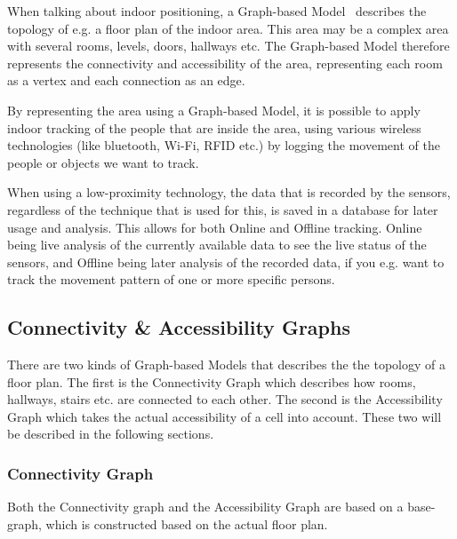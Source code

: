 When talking about indoor positioning, a Graph-based Model~\cite{Jensen:2009:GMB:1590953.1591000} describes the topology of e.g. a floor plan of the indoor area. 
This area may be a complex area with several rooms, levels, doors, hallways etc. 
The Graph-based Model therefore represents the connectivity and accessibility of the area, representing each room as a vertex and each connection as an edge. 

By representing the area using a Graph-based Model, it is possible to apply indoor tracking of the people that are inside the area, using various wireless technologies (like bluetooth, Wi-Fi, RFID etc.) by logging the movement of the people or objects we want to track.

When using a low-proximity technology, the data that is recorded by the sensors, regardless of the technique that is used for this, is saved in a database for later usage and analysis. 
This allows for both Online and Offline tracking.
Online being live analysis of the currently available data to see the live status of the sensors, and Offline being later analysis of the recorded data, if you e.g. want to track the movement pattern of one or more specific persons. 


\subsection{Connectivity \& Accessibility Graphs}
There are two kinds of Graph-based Models that describes the the topology of a floor plan. 
The first is the Connectivity Graph which describes how rooms, hallways, stairs etc. are connected to each other. 
The second is the Accessibility Graph which takes the actual accessibility of a cell into account. 
These two will be described in the following sections. 


\subsubsection{ \quad Connectivity Graph}
Both the Connectivity graph and the Accessibility Graph are based on a base-graph, which is constructed based on the actual floor plan. 

